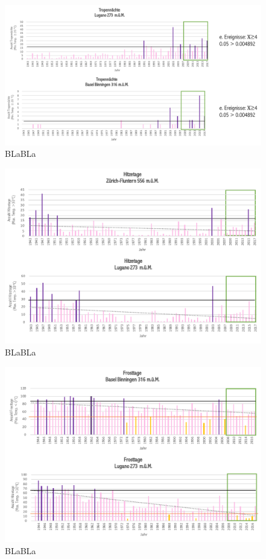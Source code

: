 \begin{refsection}
\begin{figure}
\centering
\includegraphics[width=1.0\textwidth]{extrem/Tropennacht.pdf}
\caption{BLaBLa}
\label{Tropennacht}
\end{figure}



\begin{figure}
\centering
\includegraphics[width=1.0\textwidth]{extrem/Hitzetage.pdf}
\caption{BLaBLa}
\label{Hitzetage}
\end{figure}


\begin{figure}
\centering
\includegraphics[width=1.0\textwidth]{extrem/Frosttage.pdf}
\caption{BLaBLa}
\label{Frosttage}
\end{figure}



\end{refsection}
